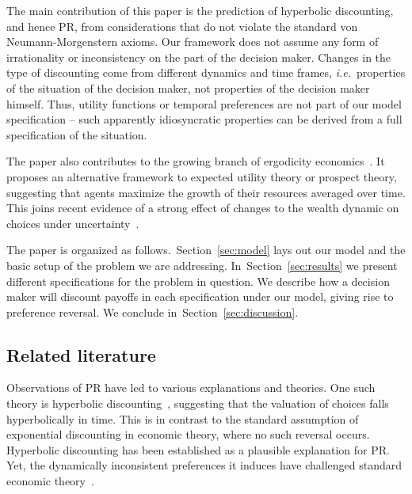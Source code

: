 \documentclass[11pt]{article}
\newcommand{\Sref}[1]{Section~\ref{sec:#1}}
\newcommand{\ie}{{\it i.e.}\ }
\numberwithin{equation}{section}
\begin{document}
The main contribution of this paper is the prediction of hyperbolic discounting, and hence PR, from considerations that do not violate the standard von Neumann-Morgenstern axioms.
Our framework does not assume any form of irrationality or inconsistency on the part of the decision maker. Changes in the type of discounting come from different dynamics and time frames, \ie properties of the situation of the decision maker, not properties of the decision maker himself. Thus, utility functions or temporal preferences are not part of our model specification -- such apparently idiosyncratic properties can be derived from a full specification of the situation.

The paper also contributes to the growing branch of ergodicity economics~\citep{peters2016evaluating,berman2016far,peters2018time}. It proposes an alternative framework to expected utility theory or prospect theory, suggesting that agents maximize the growth of their resources averaged over time. This joins recent evidence of a strong effect of changes to the wealth dynamic on choices under uncertainty~\citep{meder2019ergodicity}.

The paper is organized as follows.~\Sref{model} lays out our model and the basic setup of the problem we are addressing. In~\Sref{results} we present different specifications for the problem in question. We describe how a decision maker will discount payoffs in each specification under our model, giving rise to preference reversal. We conclude in~\Sref{discussion}.

\subsection{Related literature}

Observations of PR have led to various explanations and theories. One such theory is hyperbolic discounting~\citep{ainslie1992picoeconomics,sozou1998hyperbolic,laibson1997golden}, suggesting that the valuation of choices falls hyperbolically in time. 
This is in contrast to the standard assumption of exponential discounting in economic theory, where no such reversal occurs.
Hyperbolic discounting has been established as a plausible explanation for PR. 
Yet, the dynamically inconsistent preferences it induces have challenged standard economic theory~\citep{laibson1997golden,starmer2000developments,thaler2016behavioral}. 
\end{document}
